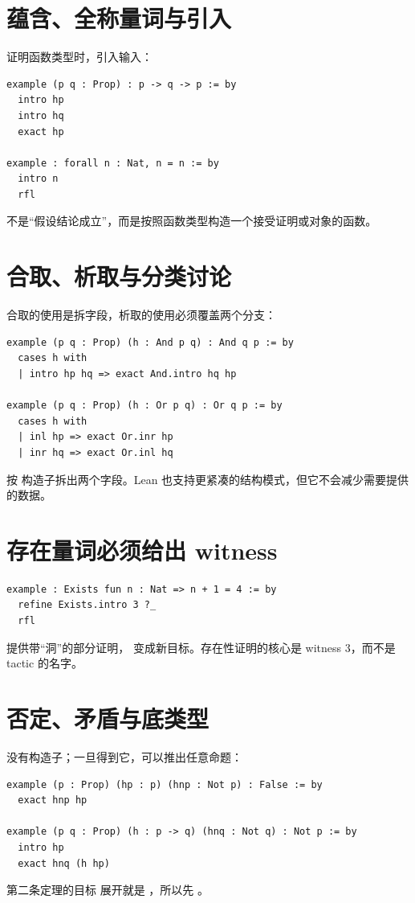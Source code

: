 \section{蕴含、全称量词与引入}

证明函数类型时，引入输入：
\begin{lstlisting}
example (p q : Prop) : p -> q -> p := by
  intro hp
  intro hq
  exact hp

example : forall n : Nat, n = n := by
  intro n
  rfl
\end{lstlisting}
 不是“假设结论成立”，而是按照函数类型构造一个接受证明或对象的函数。

\section{合取、析取与分类讨论}

合取的使用是拆字段，析取的使用必须覆盖两个分支：
\begin{lstlisting}
example (p q : Prop) (h : And p q) : And q p := by
  cases h with
  | intro hp hq => exact And.intro hq hp

example (p q : Prop) (h : Or p q) : Or q p := by
  cases h with
  | inl hp => exact Or.inr hp
  | inr hq => exact Or.inl hq
\end{lstlisting}
 按  构造子拆出两个字段。Lean 也支持更紧凑的结构模式，但它不会减少需要提供的数据。

\section{存在量词必须给出 witness}

\begin{lstlisting}
example : Exists fun n : Nat => n + 1 = 4 := by
  refine Exists.intro 3 ?_
  rfl
\end{lstlisting}
 提供带“洞”的部分证明， 变成新目标。存在性证明的核心是 witness $3$，而不是 tactic 的名字。

\section{否定、矛盾与底类型}

 没有构造子；一旦得到它，可以推出任意命题：
\begin{lstlisting}
example (p : Prop) (hp : p) (hnp : Not p) : False := by
  exact hnp hp

example (p q : Prop) (h : p -> q) (hnq : Not q) : Not p := by
  intro hp
  exact hnq (h hp)
\end{lstlisting}
第二条定理的目标  展开就是 ，所以先 。

